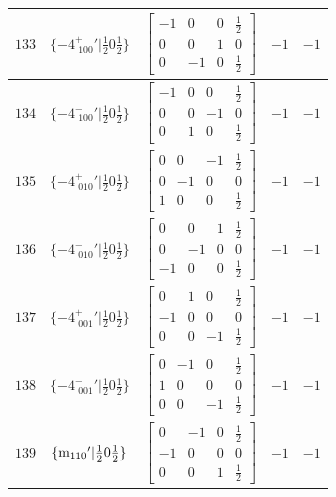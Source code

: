 \documentclass[fleqn,8pt]{jsarticle}
\begin{document}
\begin{longtable}{ccccc}
$ 133 $ & $ \{-4^{+}_{\,\,100}{}'|\frac{1}{2} 0 \frac{1}{2}\} $ & $ \begin{bmatrix} -1 & 0 & 0 & \frac{1}{2} \\ 0 & 0 & 1 & 0 \\ 0 & -1 & 0 & \frac{1}{2} \end{bmatrix} $ & $ -1 $ & $ -1 $ \\ \hline
$ 134 $ & $ \{-4^{-}_{\,\,100}{}'|\frac{1}{2} 0 \frac{1}{2}\} $ & $ \begin{bmatrix} -1 & 0 & 0 & \frac{1}{2} \\ 0 & 0 & -1 & 0 \\ 0 & 1 & 0 & \frac{1}{2} \end{bmatrix} $ & $ -1 $ & $ -1 $ \\ \hline
$ 135 $ & $ \{-4^{+}_{\,\,010}{}'|\frac{1}{2} 0 \frac{1}{2}\} $ & $ \begin{bmatrix} 0 & 0 & -1 & \frac{1}{2} \\ 0 & -1 & 0 & 0 \\ 1 & 0 & 0 & \frac{1}{2} \end{bmatrix} $ & $ -1 $ & $ -1 $ \\ \hline
$ 136 $ & $ \{-4^{-}_{\,\,010}{}'|\frac{1}{2} 0 \frac{1}{2}\} $ & $ \begin{bmatrix} 0 & 0 & 1 & \frac{1}{2} \\ 0 & -1 & 0 & 0 \\ -1 & 0 & 0 & \frac{1}{2} \end{bmatrix} $ & $ -1 $ & $ -1 $ \\ \hline
$ 137 $ & $ \{-4^{+}_{\,\,001}{}'|\frac{1}{2} 0 \frac{1}{2}\} $ & $ \begin{bmatrix} 0 & 1 & 0 & \frac{1}{2} \\ -1 & 0 & 0 & 0 \\ 0 & 0 & -1 & \frac{1}{2} \end{bmatrix} $ & $ -1 $ & $ -1 $ \\ \hline
$ 138 $ & $ \{-4^{-}_{\,\,001}{}'|\frac{1}{2} 0 \frac{1}{2}\} $ & $ \begin{bmatrix} 0 & -1 & 0 & \frac{1}{2} \\ 1 & 0 & 0 & 0 \\ 0 & 0 & -1 & \frac{1}{2} \end{bmatrix} $ & $ -1 $ & $ -1 $ \\ \hline
$ 139 $ & $ \{{\rm m}_{110}{}'|\frac{1}{2} 0 \frac{1}{2}\} $ & $ \begin{bmatrix} 0 & -1 & 0 & \frac{1}{2} \\ -1 & 0 & 0 & 0 \\ 0 & 0 & 1 & \frac{1}{2} \end{bmatrix} $ & $ -1 $ & $ -1 $ \\ \hline

\end{longtable}
\end{document}
